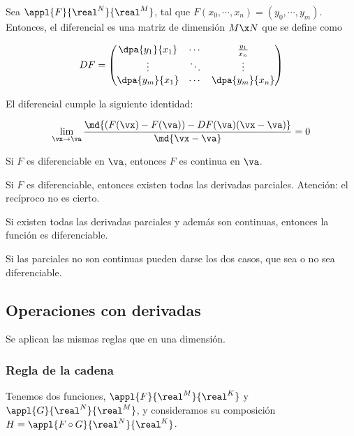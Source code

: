 \documentclass[nochap]{apuntes}
\begin{document}
\begin{defn}[Diferencial]
Sea $\appl{F}{\real^N}{\real^M}$, tal que $F(x_0,\cdots,x_n) = (y_0, \cdots, y_m)$. Entonces, el diferencial es una matriz de dimensión $M\x N$ que se define como
 

\[ DF = \left( \begin{matrix} \dpa{y_1}{x_1} & \cdots &\frac{y_1}{x_n} \\
\vdots & \ddots & \vdots \\
\dpa{y_m}{x_1} & \cdots & \dpa{y_m}{x_n} \end{matrix}\right) \]

El diferencial cumple la siguiente identidad: 

\[ \lim_{\vx\to\va} \frac{\md{(F(\vx) - F(\va)) - DF(\va)(\vx-\va)}}{\md{\vx-\va}} = 0 \]
\end{defn}

\begin{theorem}
Si $F$ es diferenciable en $\va$, entonces $F$ es continua en $\va$.
\end{theorem}

\begin{theorem}
Si $F$ es diferenciable, entonces existen todas las derivadas parciales. Atención: el recíproco no es cierto.
\end{theorem}

\begin{theorem}
Si existen todas las derivadas parciales y además son continuas, entonces la función es diferenciable.
\end{theorem}

\begin{remark}
Si las parciales no son continuas pueden darse los dos casos, que sea o no sea diferenciable.
\end{remark}

\subsection{Operaciones con derivadas}

Se aplican las mismas reglas que en una dimensión.

\subsubsection{Regla de la cadena}

Tenemos dos funciones, $\appl{F}{\real^M}{\real^K}$ y $\appl{G}{\real^N}{\real^M}$, y consideramos su composición $H=\appl{F\circ G}{\real^N}{\real^K}$.
\end{document}
